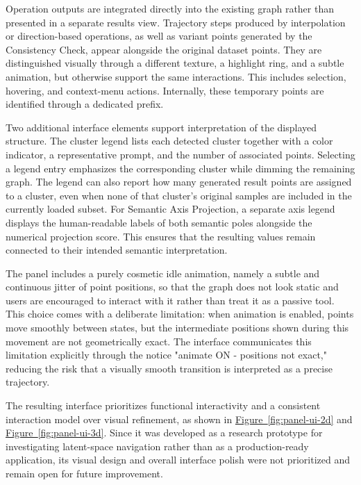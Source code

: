 Operation outputs are integrated directly into the existing graph rather than presented in a separate results view. Trajectory steps produced by interpolation or direction-based operations, as well as variant points generated by the Consistency Check, appear alongside the original dataset points. They are distinguished visually through a different texture, a highlight ring, and a subtle animation, but otherwise support the same interactions. This includes selection, hovering, and context-menu actions. Internally, these temporary points are identified through a dedicated prefix.

Two additional interface elements support interpretation of the displayed structure. The cluster legend lists each detected cluster together with a color indicator, a representative prompt, and the number of associated points. Selecting a legend entry emphasizes the corresponding cluster while dimming the remaining graph. The legend can also report how many generated result points are assigned to a cluster, even when none of that cluster's original samples are included in the currently loaded subset. For Semantic Axis Projection, a separate axis legend displays the human-readable labels of both semantic poles alongside the numerical projection score. This ensures that the resulting values remain connected to their intended semantic interpretation.

The panel includes a purely cosmetic idle animation, namely a subtle and continuous jitter of point positions, so that the graph does not look static and users are encouraged to interact with it rather than treat it as a passive tool. This choice comes with a deliberate limitation: when animation is enabled, points move smoothly between states, but the intermediate positions shown during this movement are not geometrically exact. The interface communicates this limitation explicitly through the notice "animate ON - positions not exact," reducing the risk that a visually smooth transition is interpreted as a precise trajectory.

The resulting interface prioritizes functional interactivity and a consistent interaction model over visual refinement, as shown in \hyperref[fig:panel-ui-2d]{Figure~\ref*{fig:panel-ui-2d}} and \hyperref[fig:panel-ui-3d]{Figure~\ref*{fig:panel-ui-3d}}. Since it was developed as a research prototype for investigating latent-space navigation rather than as a production-ready application, its visual design and overall interface polish were not prioritized and remain open for future improvement.

